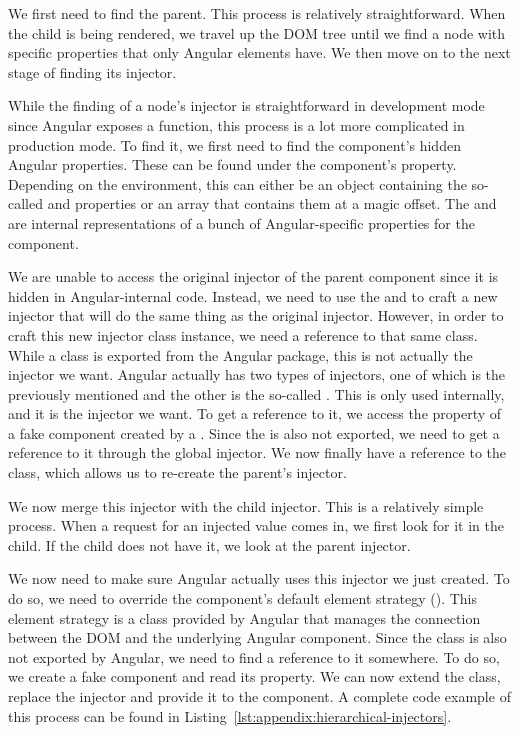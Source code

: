 {  We first need to find the parent. This process is relatively straightforward. When the child is being rendered, we travel up the DOM tree until we find a node with specific properties that only Angular elements have. We then move on to the next stage of finding its injector.

  While the finding of a node's injector is straightforward in development mode since Angular exposes a  function, this process is a lot more complicated in production mode. To find it, we first need to find the component's hidden Angular properties. These can be found under the component's  property. Depending on the environment, this can either be an object containing the so-called  and  properties or an array that contains them at a magic offset. The  and  are internal representations of a bunch of Angular-specific properties for the component.

  We are unable to access the original injector of the parent component since it is hidden in Angular-internal code. Instead, we need to use the  and  to craft a new injector that will do the same thing as the original injector. However, in order to craft this new injector class instance, we need a reference to that same class. While a  class is exported from the Angular package, this is not actually the injector we want. Angular actually has two types of injectors, one of which is the previously mentioned  and the other is the so-called . This  is only used internally, and it is the injector we want. To get a reference to it, we access the  property of a fake component created by a . Since the  is also not exported, we need to get a reference to it through the global injector. We now finally have a reference to the  class, which allows us to re-create the parent's injector.

  We now merge this injector with the child injector. This is a relatively simple process. When a request for an injected value comes in, we first look for it in the child. If the child does not have it, we look at the parent injector.

  We now need to make sure Angular actually uses this injector we just created. To do so, we need to override the component's default element strategy (). This element strategy is a class provided by Angular that manages the connection between the DOM and the underlying Angular component. Since the  class is also not exported by Angular, we need to find a reference to it somewhere. To do so, we create a fake component and read its  property. We can now extend the class, replace the injector and provide it to the component. A complete code example of this process can be found in Listing~\ref{lst:appendix:hierarchical-injectors}.
}

